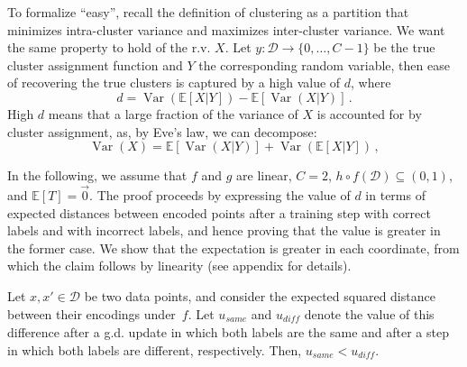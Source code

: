 \documentclass[runningheads]{llncs}
\DeclareMathOperator{\Var}{Var}
\begin{document}
 To formalize ``easy'', recall the definition of clustering as a partition that minimizes intra-cluster variance and maximizes inter-cluster variance. We want the same property to hold of the r.v. $X$. Let $y:\mathcal{D} \rightarrow \{0, \dots, C-1\}$ be the true cluster assignment function and $Y$ the corresponding random variable, then ease of recovering the true clusters is captured by a high value of $d$, where
\[
d =  \Var(\mathbb{E}[X|Y]) - \mathbb{E}[\Var(X|Y)] \,.
\]
High $d$ means that a large fraction of the variance of $X$ is accounted for by cluster assignment, as, by Eve's law, we can decompose:
\begin{equation} \label{eve}
\Var{(X)} = \mathbb{E}[\Var(X|Y)] + \Var(\mathbb{E}[X|Y]) \,,
\end{equation}

In the following, we assume that $f$ and $g$ are linear, $C=2$, $h \circ f (\mathcal{D}) \subseteq (0,1)$, and $\mathbb{E}[T] = \vec{0}$. The proof proceeds by expressing the value of $d$ in terms of expected distances between encoded points after a training step with correct labels and with incorrect labels, and hence proving that the value is greater in the former case. We  show that the expectation is greater in each coordinate, from which the claim follows by linearity (see appendix for details).

\begin{lemma} \label{lemma:smaller-dist-if-same}
    Let $x,  x' \in \mathcal{D}$ be two data points, and consider the expected squared distance between their encodings under~$f$. Let $u_{\mathit{same}}$ and $u_{\mathit{diff}}$ denote the value of this difference after a g.d. update in which both labels are the same and after a step in which both labels are different, respectively. Then, $u_{\mathit{same}} < u_{\mathit{diff}}$. 
\end{lemma}
\end{document}
